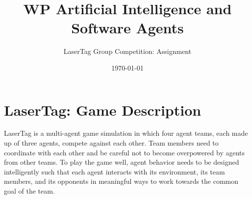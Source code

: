 \documentclass[
    a4paper,
    english,
    DIV=16,
    11pt,
    parskip=half,
]{scrartcl}
\title{WP Artificial Intelligence and Software Agents}
\subtitle{LaserTag Group Competition: Assignment}
\date{\today}
\begin{document}
\maketitle
\section*{LaserTag: Game Description}
LaserTag is a multi-agent game simulation in which four agent teams, each made up of three agents, compete against each other. Team members need to coordinate with each other and be careful not to become overpowered by agents from other teams. To play the game well, agent behavior needs to be designed intelligently such that each agent interacts with its environment, its team members, and its opponents in meaningful ways to work towards the common goal of the team.
\end{document}
